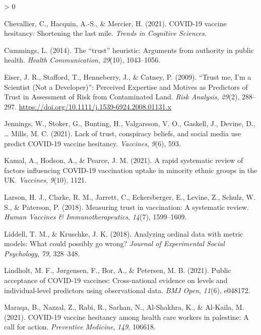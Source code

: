 \documentclass[
  english,
  ,jou,floatsintext]{apa6}
\newlength{\cslhangindent}
\newenvironment{CSLReferences}[2] %
 {%
  \setlength{\parindent}{0pt}
  \ifodd #1 \everypar{\setlength{\hangindent}{\cslhangindent}}\ignorespaces\fi
  \ifnum #2 > 0
  \setlength{\parskip}{#2\baselineskip}
  \fi
 }%
 {}
\begin{document}
\begin{CSLReferences}{1}{0}
\leavevmode\hypertarget{ref-chevallier2021covid}{}%
Chevallier, C., Hacquin, A.-S., \& Mercier, H. (2021). COVID-19 vaccine hesitancy: Shortening the last mile. \emph{Trends in Cognitive Sciences}.

\leavevmode\hypertarget{ref-cummings2014trust}{}%
Cummings, L. (2014). The {``trust''} heuristic: Arguments from authority in public health. \emph{Health Communication}, \emph{29}(10), 1043--1056.

\leavevmode\hypertarget{ref-eiser_trust_2009}{}%
Eiser, J. R., Stafford, T., Henneberry, J., \& Catney, P. (2009). {``{Trust} me, {I}'m a {Scientist} ({Not} a {Developer})''}: {Perceived} {Expertise} and {Motives} as {Predictors} of {Trust} in {Assessment} of {Risk} from {Contaminated} {Land}. \emph{Risk Analysis}, \emph{29}(2), 288--297. \url{https://doi.org/10.1111/j.1539-6924.2008.01131.x}

\leavevmode\hypertarget{ref-jennings2021lack}{}%
Jennings, W., Stoker, G., Bunting, H., Valgarsson, V. O., Gaskell, J., Devine, D., \ldots{} Mills, M. C. (2021). Lack of trust, conspiracy beliefs, and social media use predict COVID-19 vaccine hesitancy. \emph{Vaccines}, \emph{9}(6), 593.

\leavevmode\hypertarget{ref-kamal2021rapid}{}%
Kamal, A., Hodson, A., \& Pearce, J. M. (2021). A rapid systematic review of factors influencing COVID-19 vaccination uptake in minority ethnic groups in the UK. \emph{Vaccines}, \emph{9}(10), 1121.

\leavevmode\hypertarget{ref-larson2018measuring}{}%
Larson, H. J., Clarke, R. M., Jarrett, C., Eckersberger, E., Levine, Z., Schulz, W. S., \& Paterson, P. (2018). Measuring trust in vaccination: A systematic review. \emph{Human Vaccines \& Immunotherapeutics}, \emph{14}(7), 1599--1609.

\leavevmode\hypertarget{ref-liddell2018analyzing}{}%
Liddell, T. M., \& Kruschke, J. K. (2018). Analyzing ordinal data with metric models: What could possibly go wrong? \emph{Journal of Experimental Social Psychology}, \emph{79}, 328--348.

\leavevmode\hypertarget{ref-lindholt2021public}{}%
Lindholt, M. F., Jørgensen, F., Bor, A., \& Petersen, M. B. (2021). Public acceptance of COVID-19 vaccines: Cross-national evidence on levels and individual-level predictors using observational data. \emph{BMJ Open}, \emph{11}(6), e048172.

\leavevmode\hypertarget{ref-maraqa2021covid}{}%
Maraqa, B., Nazzal, Z., Rabi, R., Sarhan, N., Al-Shakhra, K., \& Al-Kaila, M. (2021). COVID-19 vaccine hesitancy among health care workers in palestine: A call for action. \emph{Preventive Medicine}, \emph{149}, 106618.


\end{CSLReferences}
\end{document}
